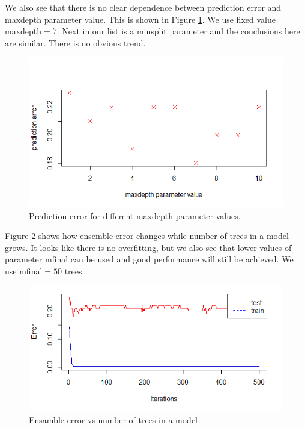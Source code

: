 \documentclass{article}
\begin{document}
 We also see that there is no clear dependence between prediction error and {\selectfont maxdepth} parameter value. This is shown in Figure \ref{fig:maxdepth_parameter_values}. We use fixed value {\selectfont maxdepth$=7$}. Next in our list is a {\selectfont minsplit} parameter and the conclusions here are similar. There is no obvious trend.
 
\begin{figure}[h] %
\includegraphics[scale=0.65]{figs/maxdepth_values}
\centering
\caption{Prediction error for different {\selectfont maxdepth} parameter values.} \label{fig:maxdepth_parameter_values}
\end{figure}

Figure \ref{fig:mfinal_parameter_values} shows how ensemble error changes while number of trees in a model grows. It looks like there is no overfitting, but we also see that lower values of parameter {\selectfont mfinal} can be used and good performance will still be achieved. We use {\selectfont mfinal$=50$} trees.

\begin{figure}[h] %
\includegraphics[scale=0.65]{figs/mfinal_500}
\centering
\caption{Ensamble error vs number of trees in a model} \label{fig:mfinal_parameter_values}
\end{figure} 
\end{document}
